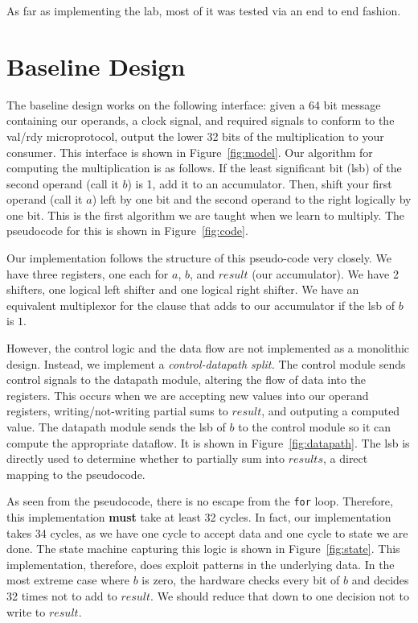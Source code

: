 \documentclass[11pt]{article}
\begin{document}
As far as implementing the lab, most of it was tested via an end to end fashion.
 


\section{Baseline Design}

The baseline design works on the following interface: 
given a 64 bit message containing our operands, a clock signal,
and required signals to conform to the val/rdy microprotocol,
output the lower 32 bits of the multiplication to your consumer.
This interface is shown in Figure~\ref{fig:model}.
Our algorithm for computing the multiplication is as follows.
If the least significant bit (lsb) of the second operand (call it $b$) is 1, add it to an accumulator.
Then, shift your first operand (call it $a$) left by one bit and the second operand to the right logically by one bit.
This is the first algorithm we are taught when we learn to multiply.
The pseudocode for this is shown in Figure~\ref{fig:code}. 

Our implementation follows the structure of this pseudo-code very closely.
We have three registers, one each for $a$, $b$, and $result$ (our accumulator).
We have 2 shifters, one logical left shifter and one logical right shifter. 
We have an equivalent multiplexor for the clause that adds to our accumulator if the lsb of $b$ is $1$.

However, the control logic and the data flow are not implemented as a monolithic design.
Instead, we implement a \textit{control-datapath split.}
The control module sends control signals to the datapath module, altering the flow of data into the registers.
This occurs when we are accepting new values into our operand registers,
writing/not-writing partial sums to $result$, and outputing a computed value.
The datapath module sends the lsb of $b$ to the control module so it can compute the appropriate dataflow.
It is shown in Figure~\ref{fig:datapath}.
The lsb is directly used to determine whether to partially sum into $results$, a direct mapping to the pseudocode.

As seen from the pseudocode, there is no escape from the \verb+for+ loop.
Therefore, this implementation \textbf{must} take at least 32 cycles.
In fact, our implementation takes 34 cycles, as we have one cycle to accept data and one cycle to state we are done.
The state machine capturing this logic is shown in Figure~\ref{fig:state}. 
This implementation, therefore, does exploit patterns in the underlying data.
In the most extreme case where $b$ is zero, the hardware checks every bit of $b$ and decides 32 times not to add to $result$.
We should reduce that down to one decision not to write to $result$.
\end{document}
